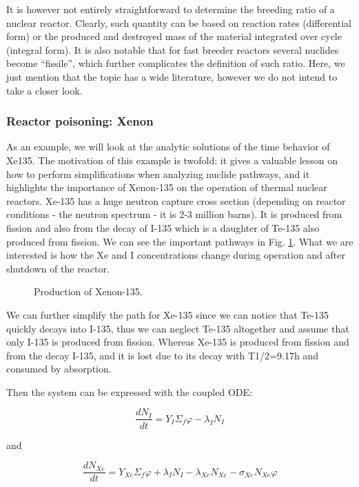 It is however not entirely straightforward to determine the breeding ratio of a nuclear reactor. Clearly, such quantity can be based on reaction rates (differential form) or the produced and destroyed mass of the material integrated over cycle (integral form). It is also notable that for fast breeder reactors several nuclides become ``fissile'', which further complicates the definition of such ratio. Here, we just mention that the topic has a wide literature, however we do not intend to take a closer look.


\subsubsection{Reactor poisoning: Xenon}

As an example, we will look at the analytic solutions of the time behavior of Xe135. The motivation of this example is twofold: it gives a valuable lesson on how to perform simplifications when analyzing nuclide pathways, and it highlights the importance of Xenon-135 on the operation of thermal nuclear reactors. Xe-135  has a huge neutron capture cross section (depending on reactor conditions - the neutron spectrum - it is 2-3 million barns). It is produced from fission and also from the decay of I-135 which is a daughter of Te-135 also  produced from fission. We can see the important pathways in Fig. \ref{fig:xenonprod}. What we are interested is how the Xe and I concentrations change during operation and after shutdown of the reactor.

\begin{figure}[ht!]
\protect {}\protect
\caption{\label{fig:xenonprod} \footnotesize{Production of Xenon-135.}}
\end{figure}

We can further simplify the path for Xe-135 since we can notice that Te-135 quickly decays into I-135, thus we can neglect Te-135 altogether and assume that only I-135 is produced from fission. Whereas Xe-135 is produced from fission and from the decay I-135, and it is lost due to its decay with T1/2=9.17h and consumed by absorption. 

Then the system can be expressed with the coupled ODE:


$$ \frac{dN_I}{dt}=Y_I \Sigma_f\varphi-\lambda_I N_I $$

and

$$ \frac{dN_{Xe}}{dt}=Y_{Xe}\Sigma_f\varphi + \lambda_IN_I -\lambda_{Xe}N_{Xe} - \sigma_{Xe}N_{Xe}\varphi  $$

